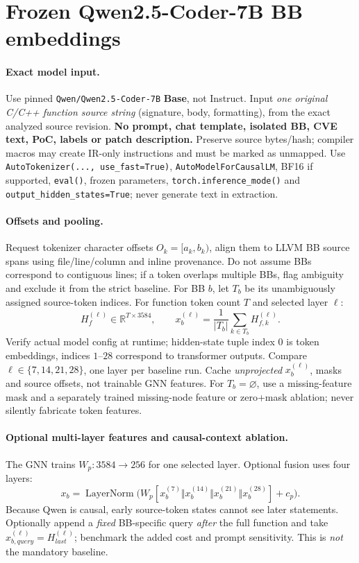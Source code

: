 \documentclass[10pt,a4paper]{article}
\begin{document}
\section{Frozen Qwen2.5-Coder-7B BB embeddings}
\paragraph{Exact model input.}
Use pinned \texttt{Qwen/Qwen2.5-Coder-7B} \textbf{Base}, not Instruct. Input \emph{one original C/C++ function source string} (signature, body, formatting), from the exact analyzed source revision. \textbf{No prompt, chat template, isolated BB, CVE text, PoC, labels or patch description.} Preserve source bytes/hash; compiler macros may create IR-only instructions and must be marked as unmapped. Use \texttt{AutoTokenizer(..., use\_fast=True)}, \texttt{AutoModelForCausalLM}, BF16 if supported, \texttt{eval()}, frozen parameters, \texttt{torch.inference\_mode()} and \texttt{output\_hidden\_states=True}; never generate text in extraction.

\paragraph{Offsets and pooling.}
Request tokenizer character offsets $O_k=[a_k,b_k)$, align them to LLVM BB source spans using file/line/column and inline provenance. Do not assume BBs correspond to contiguous lines; if a token overlaps multiple BBs, flag ambiguity and exclude it from the strict baseline. For BB $b$, let $T_b$ be its unambiguously assigned source-token indices. For function token count $T$ and selected layer $\ell$:
\[
 H_f^{(\ell)}\in\mathbb R^{T\times3584},\qquad
 x_b^{(\ell)}=\frac1{|T_b|}\sum_{k\in T_b}H_{f,k}^{(\ell)}.
\]
Verify actual model config at runtime; hidden-state tuple index $0$ is token embeddings, indices $1$--$28$ correspond to transformer outputs. Compare \(\ell\in\{7,14,21,28\}\), one layer per baseline run. Cache \emph{unprojected} $x_b^{(\ell)}$, masks and source offsets, not trainable GNN features. For $T_b=\varnothing$, use a missing-feature mask and a separately trained missing-node feature or zero+mask ablation; never silently fabricate token features.

\paragraph{Optional multi-layer features and causal-context ablation.}
The GNN trains $W_p:3584\to256$ for one selected layer. Optional fusion uses four layers:
\[
 x_b=\operatorname{LayerNorm}\big(W_p[x_b^{(7)}\Vert x_b^{(14)}\Vert x_b^{(21)}\Vert x_b^{(28)}]+c_p\big).
\]
Because Qwen is causal, early source-token states cannot see later statements. Optionally append a \emph{fixed} BB-specific query \emph{after} the full function and take $x_{b,query}^{(\ell)}=H_{last}^{(\ell)}$; benchmark the added cost and prompt sensitivity. This is \emph{not} the mandatory baseline.
\end{document}
